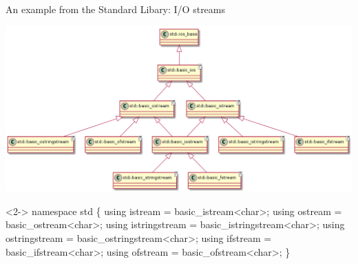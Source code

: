 \begin{frame}[fragile]{An example from the Standard Libary: I/O streams}



  \centering\includegraphics[width=\textwidth]{images/iostream}
  \begin{codeblock}<2->{\tiny
namespace std \{
  using istream = basic_istream<char>;
  using ostream = basic_ostream<char>;
  using istringstream = basic_istringstream<char>;
  using ostringstream = basic_ostringstream<char>;
  using ifstream = basic_ifstream<char>;
  using ofstream = basic_ofstream<char>;
  \ddd
\}}\end{codeblock}
\end{frame}

